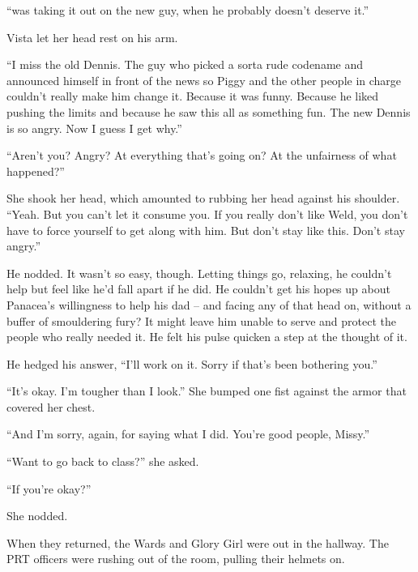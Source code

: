 ``\ldotsI was taking it out on the new guy, when he probably doesn't deserve it.''



Vista let her head rest on his arm.



``I miss the old Dennis.  The guy who picked a sorta rude codename and announced himself in front of the news so Piggy and the other people in charge couldn't really make him change it.  Because it was funny.  Because he liked pushing the limits and because he saw this all as something fun.  The new Dennis is so angry.  Now I guess I get why.''



``Aren't you?  Angry?  At everything that's going on?  At the unfairness of what happened?''



She shook her head, which amounted to rubbing her head against his shoulder.  ``Yeah.  But you can't let it consume you.  If you really don't like Weld, you don't have to force yourself to get along with him.  But don't stay like this.  Don't stay angry.''



He nodded.  It wasn't so easy, though.  Letting things go, relaxing, he couldn't help but feel like he'd fall apart if he did.  He couldn't get his hopes up about Panacea's willingness to help his dad – and facing any of that head on, without a buffer of smouldering fury?  It might leave him unable to serve and protect the people who really needed it.  He felt his pulse quicken a step at the thought of it.



He hedged his answer, ``I'll work on it.  Sorry if that's been bothering you.''



``It's okay.  I'm tougher than I look.''  She bumped one fist against the armor that covered her chest.



``And I'm sorry, again, for saying what I did.  You're good people, Missy.''



``Want to go back to class?'' she asked.



``If you're okay?''



She nodded.



When they returned, the Wards and Glory Girl were out in the hallway.  The PRT officers were rushing out of the room, pulling their helmets on.



